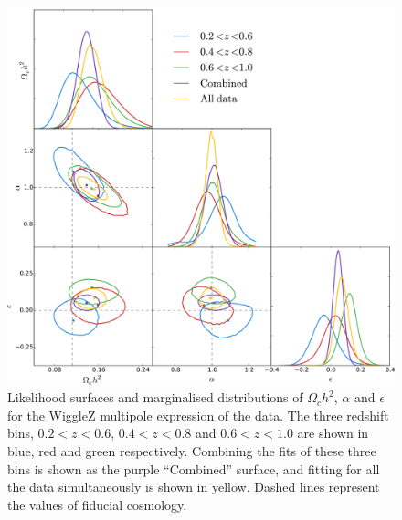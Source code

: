 \documentclass[a4paper,fleqn,usenatbib]{mnras}
\begin{document}
\begin{figure}
	\begin{center}
		\includegraphics[width=\columnwidth]{corCombinedMPWig.png}
	\end{center}
	\caption{Likelihood surfaces and marginalised distributions of $\Omega_ch^2$, $\alpha$ and $\epsilon$ for the WiggleZ multipole expression of the data. The three redshift bins, $0.2<z<0.6$, $0.4<z<0.8$ and $0.6<z<1.0$ are shown in blue, red and green respectively. Combining the fits of these three bins is shown as the purple ``Combined'' surface, and fitting for all the data simultaneously is shown in yellow. Dashed lines represent the values of fiducial cosmology.}
	\label{fig:wigglezBinsMP}
\end{figure}
\end{document}
